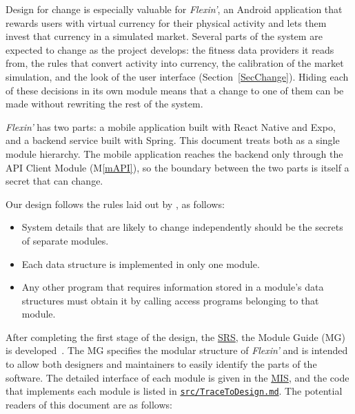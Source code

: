 \documentclass[12pt, titlepage]{article}
\newcommand{\mref}[1]{M\ref{#1}}
\begin{document}
Design for change is especially valuable for \textit{Flexin'}, an Android
application that rewards users with virtual currency for their physical
activity and lets them invest that currency in a simulated market. Several
parts of the system are expected to change as the project develops: the
fitness data providers it reads from, the rules that convert activity into
currency, the calibration of the market simulation, and the look of the user
interface (Section~\ref{SecChange}). Hiding each of these decisions in its own
module means that a change to one of them can be made without rewriting the
rest of the system.

\textit{Flexin'} has two parts: a mobile application built with React Native and
Expo, and a backend service built with Spring. This document treats both as a
single module hierarchy. The mobile application reaches the backend only
through the API Client Module (\mref{mAPI}), so the boundary between the two
parts is itself a secret that can change.

Our design follows the rules laid out by \citet{ParnasEtAl1984}, as follows:
\begin{itemize}
\item System details that are likely to change independently should be the
  secrets of separate modules.
\item Each data structure is implemented in only one module.
\item Any other program that requires information stored in a module's data
  structures must obtain it by calling access programs belonging to that module.
\end{itemize}

After completing the first stage of the design, the
\href{https://github.com/arjunkarthik123/fitness-finance-application/blob/main/pdfs/SRS-Volere/SRS.pdf}{SRS},
the Module Guide (MG) is developed~\citep{ParnasEtAl1984}. The MG specifies
the modular structure of \textit{Flexin'} and is intended to allow both designers
and maintainers to easily identify the parts of the software. The detailed
interface of each module is given in the
\href{https://github.com/arjunkarthik123/fitness-finance-application/blob/main/pdfs/Design/SoftDetailedDes/MIS.pdf}{MIS},
and the code that implements each module is listed in
\href{https://github.com/arjunkarthik123/fitness-finance-application/blob/main/src/TraceToDesign.md}{\texttt{src/TraceToDesign.md}}.
The potential readers of this document are as follows:
\end{document}
